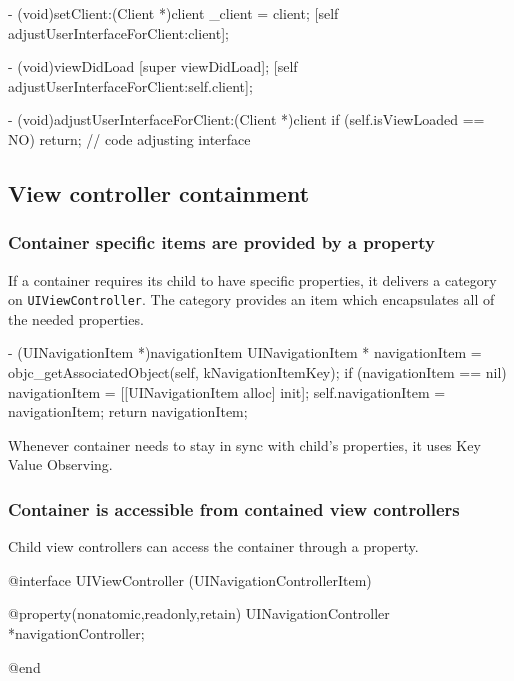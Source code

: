 \documentclass[10pt]{extarticle}
\newenvironment{codelisting}
{\footnotesize\mdframed[middlelinewidth=0.5pt, middlelinecolor=BaliHaiColor, skipabove=15pt]\verbatim}
{\endverbatim\endmdframed\vspace{12pt}\normalsize}
\newcommand{\inlinecode}[1]{{\textcolor{TundoraColor}{\texttt{#1}}}}
\begin{document}
\begin{codelisting}
- (void)setClient:(Client *)client
{
    _client = client;
    [self adjustUserInterfaceForClient:client];
}

- (void)viewDidLoad
{
    [super viewDidLoad];
    [self adjustUserInterfaceForClient:self.client];
}

- (void)adjustUserInterfaceForClient:(Client *)client
{
    if (self.isViewLoaded == NO) return;
    // code adjusting interface
}
\end{codelisting}


\subsection{View controller containment}


\subsubsection{Container specific items are provided by a property}


If a container requires its child to have specific properties, it delivers a category on \inlinecode{UIViewController}. The category provides an item which encapsulates all of the needed properties.

\begin{codelisting}
- (UINavigationItem *)navigationItem
{
    UINavigationItem * navigationItem = objc_getAssociatedObject(self, kNavigationItemKey);
    if (navigationItem == nil) {
        navigationItem = [[UINavigationItem alloc] init];
        self.navigationItem = navigationItem;
    }
    return navigationItem;
}
\end{codelisting}

Whenever container needs to stay in sync with child's properties, it uses Key Value Observing.


\subsubsection{Container is accessible from contained view controllers}

Child view controllers can access the container through a property.

\begin{codelisting}
@interface UIViewController (UINavigationControllerItem)

@property(nonatomic,readonly,retain) UINavigationController *navigationController;

@end
\end{codelisting}
\end{document}
